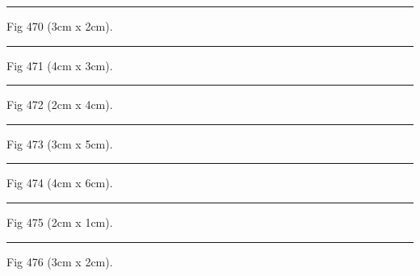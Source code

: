 \documentclass[a4paper,11pt]{article}
\begin{document}
\begin{swarmwrap}%
  \begin{minipage}[t]{3cm}
    \centering
    \rule{\linewidth}{2cm}
    {\footnotesize Fig 470 (3cm x 2cm).}
  \end{minipage}%
\end{swarmwrap}%
\swarmwrapnext
\lipsum[20]%

\begin{swarmwrap}%
  \begin{minipage}[t]{4cm}
    \centering
    \rule{\linewidth}{3cm}
    {\footnotesize Fig 471 (4cm x 3cm).}
  \end{minipage}%
\end{swarmwrap}%
\swarmwrapnext
\lipsum[21]%

\begin{swarmwrap}%
  \begin{minipage}[t]{2cm}
    \centering
    \rule{\linewidth}{4cm}
    {\footnotesize Fig 472 (2cm x 4cm).}
  \end{minipage}%
\end{swarmwrap}%
\swarmwrapnext
\lipsum[22]%

\begin{swarmwrap}%
  \begin{minipage}[t]{3cm}
    \centering
    \rule{\linewidth}{5cm}
    {\footnotesize Fig 473 (3cm x 5cm).}
  \end{minipage}%
\end{swarmwrap}%
\swarmwrapnext
\lipsum[23]%

\begin{swarmwrap}%
  \begin{minipage}[t]{4cm}
    \centering
    \rule{\linewidth}{6cm}
    {\footnotesize Fig 474 (4cm x 6cm).}
  \end{minipage}%
\end{swarmwrap}%
\swarmwrapnext
\lipsum[24]%

\begin{swarmwrap}%
  \begin{minipage}[t]{2cm}
    \centering
    \rule{\linewidth}{1cm}
    {\footnotesize Fig 475 (2cm x 1cm).}
  \end{minipage}%
\end{swarmwrap}%
\swarmwrapnext
\lipsum[25]%

\begin{swarmwrap}%
  \begin{minipage}[t]{3cm}
    \centering
    \rule{\linewidth}{2cm}
    {\footnotesize Fig 476 (3cm x 2cm).}
  \end{minipage}%
\end{swarmwrap}%
\swarmwrapnext
\lipsum[26]%
\end{document}
